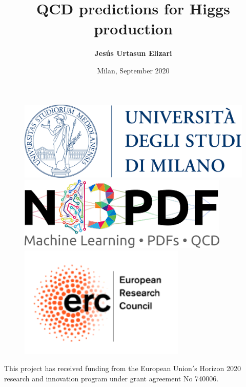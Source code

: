\documentclass[aspectratio=43]{beamer}
\title[QCD predictions for Higgs production]{QCD predictions for Higgs production}
\author{\textbf {Jes\'us Urtasun Elizari}}
\date{Milan, September 2020}
\begin{document}
\begin{frame}

	\vspace{1.0 cm}
	
	
	\vspace{0.25 cm}

	\begin{figure}
		\includegraphics[width = 3.0 cm]{plots/unimi.png}
		\hfill
		\includegraphics[width = 3.0 cm]{plots/n3pdf.png}
		\hfill
		\includegraphics[width = 3.0 cm]{plots/erc.png}
		\endminipage
	\end{figure}

	\vspace{1.0 cm}
	
	{\scriptsize \color{blue} This project has received funding from the European Union$'$s Horizon 2020 research and innovation program under grant agreement No 740006.}

\end{frame}
\end{document}
